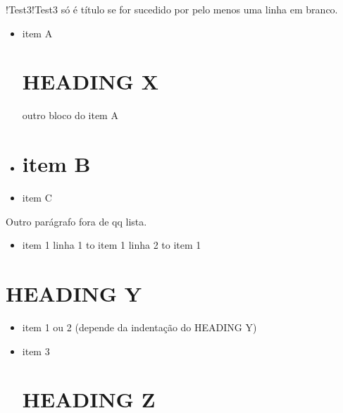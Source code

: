 \documentclass{article}
\begin{document}
!Test3!Test3 só é título se for sucedido por pelo menos uma linha em branco.

\begin{itemize}
\item  item A

\section*{HEADING X}
  outro bloco do item A


\item \section*{item B}

\item  item C


\end{itemize}
Outro parágrafo fora  de qq lista.

\begin{itemize}
\item  item 1
  linha 1 to item 1
  linha 2 to item 1
\end{itemize}
\section*{HEADING Y}
\begin{itemize}
\item  item 1 ou 2 (depende da indentação do HEADING Y)


\item  item 3

\section*{HEADING Z}

\end{itemize}
\end{document}
